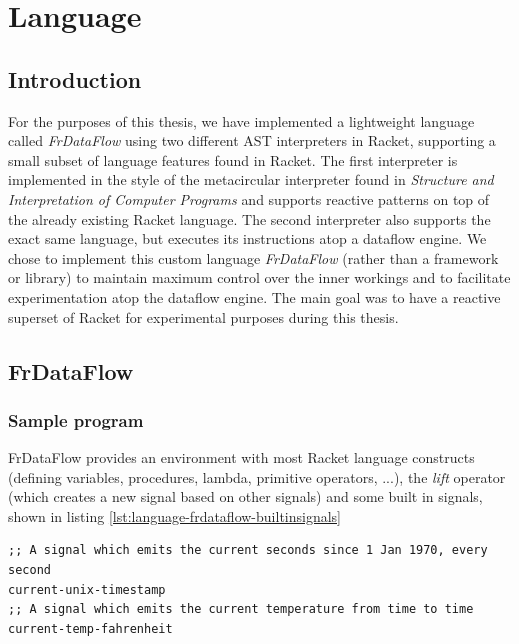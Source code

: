 \chapter{Language}
\lstset{language=lisp,showtabs=false}

\section{Introduction}

For the purposes of this thesis, we have implemented a lightweight language called \textit{FrDataFlow} using two different AST interpreters in Racket, supporting a small subset of language features found in Racket. The first interpreter is implemented in the style of the metacircular interpreter found in   \textit{Structure and Interpretation of Computer Programs} \cite{abelson_structure_1999} and supports reactive patterns on top of the already existing Racket language. The second interpreter also supports the exact same language, but executes its instructions atop a dataflow engine. We chose to implement this custom language \textit{FrDataFlow} (rather than a framework or library) to maintain maximum control over the inner workings and to facilitate experimentation atop the dataflow engine. The main goal was to have a reactive superset of Racket for experimental purposes during this thesis.

\newpage
\section{FrDataFlow}


\subsection{Sample program}

FrDataFlow provides an environment with most Racket language constructs (defining variables, procedures, lambda, primitive operators, ...), the \textit{lift} operator (which creates a new signal based on other signals) and some built in signals, shown in listing \ref{lst:language-frdataflow-builtinsignals}

\begin{lstlisting}[caption={Built in signals},captionpos=b,label={lst:language-frdataflow-builtinsignals},language=FrDataFlow]
;; A signal which emits the current seconds since 1 Jan 1970, every second
current-unix-timestamp	
;; A signal which emits the current temperature from time to time
current-temp-fahrenheit 
\end{lstlisting}

